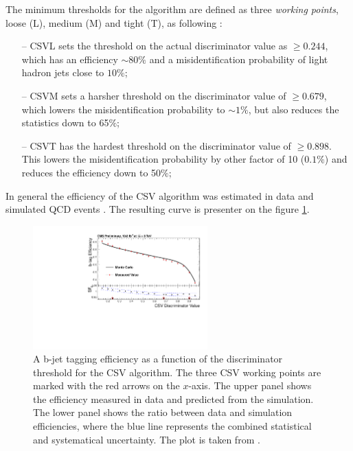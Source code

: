 The minimum thresholds for the algorithm are defined as three \textit{working points}, loose (L), medium (M) and tight (T), as following \cite{CMS-PAS-BTV-13-001}:

\begin{itemize}
 \item [--] CSVL sets the threshold on the actual discriminator value as $\geq 0.244$, which has an efficiency $\sim 80\%$ and a misidentification probability of
 light hadron jets close to $10\%$;
 \item [--] CSVM sets a harsher threshold on the discriminator value of $\geq 0.679$, which lowers the misidentification probability to $\sim 1\%$, but also
 reduces the statistics down to 65$\%$;
 \item [--] CSVT has the hardest threshold on the discriminator value of $\geq 0.898$. This lowers the misidentification probability by other factor of 10 ($0.1\%$)
 and reduces the efficiency down to 50$\%$;
\end{itemize}

In general the efficiency of the CSV algorithm was estimated in data and simulated QCD events \cite{CMS-PAS-BTV-13-001}. The resulting curve is presenter on the figure \ref{fig:CSVeff}.

\begin{figure}[t]
  \centering
  \includegraphics[width=0.6\textwidth]{04_event_reconstruction/plots/Figure_012-b.pdf}
  \caption{A b-jet tagging efficiency as a function of the discriminator threshold for the CSV algorithm. The three CSV working points are marked with the red arrows on the $x$-axis.
  The upper panel shows the efficiency measured in data and predicted from the simulation.
  The lower panel shows the ratio between data and simulation efficiencies, where the blue line represents the combined statistical and systematical uncertainty. The plot is taken from \cite{CMS-PAS-BTV-13-001}.}
  \label{fig:CSVeff}
\end{figure}

